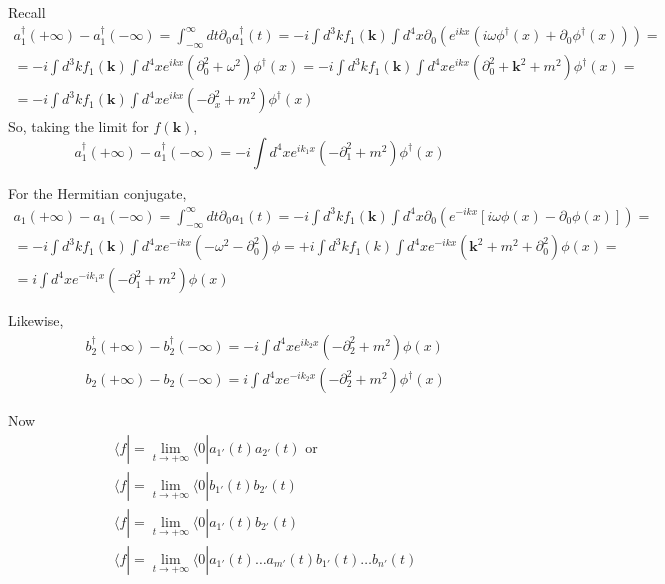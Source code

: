 \documentclass[twoside]{amsart}
\begin{document}
Recall
\[
\begin{gathered}
  a^{\dag}_1(+\infty) - a_1^{\dag}(-\infty) = \int_{-\infty}^{\infty} dt \partial_0 a_1^{\dag}(t) = - i \int d^3k f_1(\mathbf{k}) \int d^4x \partial_0 (e^{ikx} (i \omega \phi^{\dag}(x) + \partial_0 \phi^{\dag}(x) ) ) = \\
  = -i \int d^3k f_1(\mathbf{k}) \int d^4x e^{ikx} (\partial_0^2 + \omega^2) \phi^{\dag}(x) = -i \int d^3k f_1(\mathbf{k}) \int d^4x e^{ikx} (\partial_0^2 + \mathbf{k}^2 + m^2) \phi^{\dag}(x) =\\ 
   =-i \int d^3k f_1(\mathbf{k}) \int d^4x e^{ikx} (-\partial_x^2 + m^2) \phi^{\dag}(x)
\end{gathered}
\]
So, taking the limit for $f(\mathbf{k})$, 
\[
a_1^{\dag}(+\infty) - a_1^{\dag}(-\infty) = -i \int d^4 x e^{ik_1 x} (-\partial_1^2 + m^2 ) \phi^{\dag}(x)
\]

For the Hermitian conjugate, 
\[
\begin{gathered}
  a_1(+\infty) - a_1(-\infty) = \int_{-\infty}^{\infty} dt \partial_0 a_1(t) = -i \int d^3k f_1(\mathbf{k}) \int d^4x \partial_0 (e^{-ikx} [ i\omega \phi(x) - \partial_0 \phi(x)] ) = \\ 
  = -i \int d^3k f_1(\mathbf{k}) \int d^4x e^{-ikx} (-\omega^2  - \partial_0^2 ) \phi = + i \int d^3k f_1(k) \int d^4x e^{-ikx} (\mathbf{k}^2 + m^2 + \partial_0^2) \phi(x) = \\ 
= i \int d^4x e^{-ik_1x} (-\partial_1^2 + m^2 )\phi(x)
\end{gathered}
\]

Likewise,
\[
\begin{aligned}
  & b_2^{\dag}(+\infty) - b_2^{\dag}(-\infty) = -i \int d^4x e^{ik_2 x} (-\partial_2^2 + m^2)\phi(x) \\ 
  & b_2(+\infty) - b_2(-\infty) = i \int d^4x e^{-ik_2 x} (-\partial_2^2 + m^2) \phi^{\dag}(x)
\end{aligned}
\]


Now
\[
\begin{aligned}
  & \langle f | = \lim_{t \to +\infty} \langle 0 | a_{1'}(t) a_{2'}(t) \text{ or } \\ 
  & \langle f | = \lim_{t \to +\infty} \langle 0 | b_{1'}(t) b_{2'}(t)  \\ 
  & \langle f | = \lim_{t \to +\infty} \langle 0 | a_{1'}(t) b_{2'}(t) \\ 
  & \langle f | = \lim_{t \to +\infty} \langle 0 | a_{1'}(t) \dots a_{m'}(t) b_{1'}(t) \dots b_{n'}(t)
\end{aligned}
\]
\end{document}
